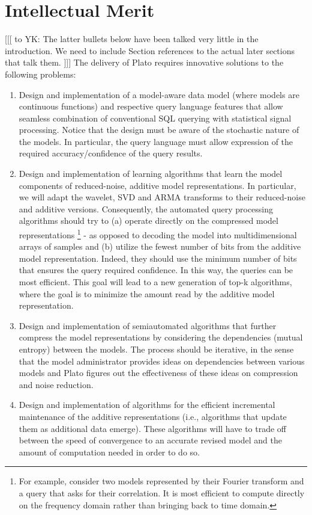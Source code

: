 \documentclass{article}
\newcommand{\reminder}[1]{ [[[ \marginpar{\mbox{$<==$}} #1 ]]] }
\begin{document}
\section{Intellectual Merit}
\label{sec:merit}
\reminder{to YK: The latter bullets below have been talked very little in the introduction. We need to include Section references to the actual later sections that talk them.
}
The delivery of Plato requires innovative solutions to the following problems:
%
\begin{enumerate}
%
\item Design and implementation of a model-aware data model (where models are continuous functions) and respective query language features that allow seamless combination of conventional SQL querying with statistical signal processing. Notice that the design must be aware of the stochastic nature of the models. In particular, the query language must allow expression of the required accuracy/confidence of the query results.
%
\item Design and implementation of learning algorithms that learn the model components of reduced-noise, additive model representations. In particular, we will adapt the wavelet, SVD and ARMA transforms to their reduced-noise and additive versions. Consequently, the automated query processing algorithms should try to (a) operate directly on the compressed model representations%
\footnote{
For example, consider two models represented by their Fourier transform and a query that asks for their correlation. It is most efficient to compute directly on the frequency domain rather than bringing back to time domain.
} - as opposed to decoding the model into multidimensional arrays of samples and (b) utilize the fewest number of bits from the additive model representation. Indeed, they should use the minimum number of bits that ensures the query required confidence. In this way, the queries can be most efficient. This goal will lead to a new generation of top-k algorithms, where the goal is to minimize the amount read by the additive model representation.
%
\item Design and implementation of semiautomated algorithms that further compress the model representations by considering the dependencies (mutual entropy) between the models. The process should be iterative, in the sense that the model administrator provides ideas on dependencies between various models and Plato figures out the effectiveness of these ideas on compression and noise reduction.
%
\item Design and implementation of algorithms for the efficient incremental maintenance of the additive representations (i.e., algorithms that update them as additional data emerge). These algorithms will have to trade off between the speed of convergence to an accurate revised model and the amount of computation needed in order to do so.

\end{enumerate}
\end{document}
